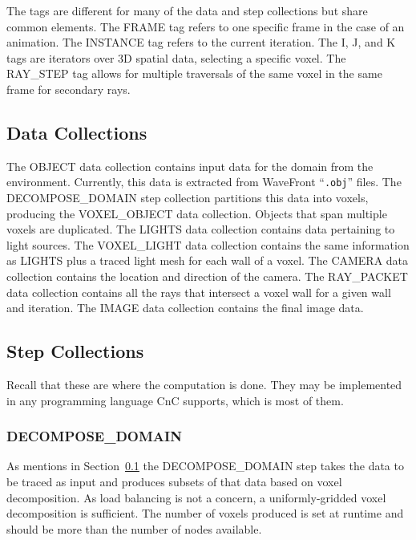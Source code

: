The tags are different for many of the data and step collections but
share common elements. The FRAME tag refers to one specific frame in
the case of an animation. The INSTANCE tag refers to the current
iteration. The I, J, and K tags are iterators over 3D spatial data,
selecting a specific voxel. The RAY\_STEP tag allows for multiple
traversals of the same voxel in the same frame for secondary rays.

\subsection{Data Collections}
\label{sec:datacollections}

The OBJECT data collection contains input data for the domain from the
environment. Currently, this data is extracted from WaveFront
``\texttt{.obj}'' files. The DECOMPOSE\_DOMAIN step collection
partitions this data into voxels, producing the VOXEL\_OBJECT data
collection. Objects that span multiple voxels are duplicated. The
LIGHTS data collection contains data pertaining to light sources. The
VOXEL\_LIGHT data collection contains the same information as LIGHTS
plus a traced light mesh for each wall of a voxel. The CAMERA data
collection contains the location and direction of the camera. The
RAY\_PACKET data collection contains all the rays that intersect a
voxel wall for a given wall and iteration. The IMAGE data collection
contains the final image data.

\subsection{Step Collections}

Recall that these are where the computation is done. They may be
implemented in any programming language CnC supports, which is most of
them.

\subsubsection{DECOMPOSE\_DOMAIN}

As mentions in Section~\ref{sec:datacollections} the DECOMPOSE\_DOMAIN
step takes the data to be traced as input and produces subsets of that
data based on voxel decomposition. As load balancing is not a concern,
a uniformly-gridded voxel decomposition is sufficient. The number of
voxels produced is set at runtime and should be more than the number
of nodes available.

